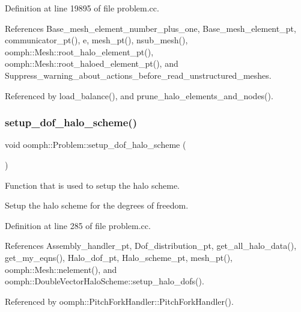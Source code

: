 Definition at line 19895 of file problem.\+cc.



References Base\+\_\+mesh\+\_\+element\+\_\+number\+\_\+plus\+\_\+one, Base\+\_\+mesh\+\_\+element\+\_\+pt, communicator\+\_\+pt(), e, mesh\+\_\+pt(), nsub\+\_\+mesh(), oomph\+::\+Mesh\+::root\+\_\+halo\+\_\+element\+\_\+pt(), oomph\+::\+Mesh\+::root\+\_\+haloed\+\_\+element\+\_\+pt(), and Suppress\+\_\+warning\+\_\+about\+\_\+actions\+\_\+before\+\_\+read\+\_\+unstructured\+\_\+meshes.



Referenced by load\+\_\+balance(), and prune\+\_\+halo\+\_\+elements\+\_\+and\+\_\+nodes().

\mbox{\label{classoomph_1_1Problem_a216679e2a976e0205165bbe7ab558579}} 
\subsubsection{\texorpdfstring{setup\+\_\+dof\+\_\+halo\+\_\+scheme()}{setup\_dof\_halo\_scheme()}}
{\footnotesize\ttfamily void oomph\+::\+Problem\+::setup\+\_\+dof\+\_\+halo\+\_\+scheme (\begin{DoxyParamCaption}{ }\end{DoxyParamCaption})\hspace{0.3cm}{\ttfamily [protected]}}



Function that is used to setup the halo scheme. 

Setup the halo scheme for the degrees of freedom. 

Definition at line 285 of file problem.\+cc.



References Assembly\+\_\+handler\+\_\+pt, Dof\+\_\+distribution\+\_\+pt, get\+\_\+all\+\_\+halo\+\_\+data(), get\+\_\+my\+\_\+eqns(), Halo\+\_\+dof\+\_\+pt, Halo\+\_\+scheme\+\_\+pt, mesh\+\_\+pt(), oomph\+::\+Mesh\+::nelement(), and oomph\+::\+Double\+Vector\+Halo\+Scheme\+::setup\+\_\+halo\+\_\+dofs().



Referenced by oomph\+::\+Pitch\+Fork\+Handler\+::\+Pitch\+Fork\+Handler().

\mbox{\label{classoomph_1_1Problem_a919a5f4752362df6005d24e51b5780e0}} 
